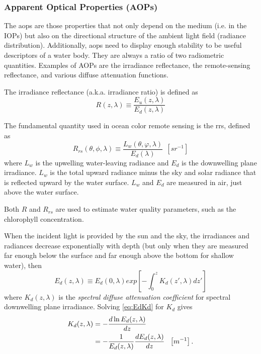 \subsubsection*{Apparent Optical Properties (AOPs)}
The \gls{aops} are those properties that not only depend on the medium (i.e. in the IOPs) but also on the directional structure of the ambient light field (radiance distribution). Additionally, \gls{aops} need to display enough stability to be useful descriptors of a water body. They are always a ratio of two radiometric quantities. Examples of AOPs are the irradiance reflectance, the remote-sensing reflectance, and various diffuse attenuation functions.

The irradiance reflectance (a.k.a. irradiance ratio) is defined as
\begin{equation}
  R(z,\lambda)\equiv \frac{E_u(z,\lambda)}{E_d(z,\lambda)}
\end{equation}

The fundamental quantity used in ocean color remote sensing is the \acrfull{rrs}, defined as
\begin{equation}
  R_{rs}(\theta,\phi,\lambda)\equiv \frac{L_w(\theta,\varphi,\lambda)}{E_d(\lambda)}~~\left[sr^{-1} \right]
\end{equation}
where $L_w$ is the upwelling water-leaving radiance and $E_d$ is the downwelling plane irradiance. $L_w$ is the total upward radiance minus the sky and solar radiance that is reflected upward by the water surface. $L_w$ and $E_d$ are measured in air, just above the water surface.

Both $R$ and $R_{rs}$ are used to estimate water quality parameters, such as the chlorophyll concentration.

When the incident light is provided by the sun and the sky, the irradiances and radiances decrease exponentially with depth (but only when they are measured far enough below the surface and far enough above the bottom for shallow water), then
\begin{equation}\label{eq:EdKd}
  E_d(z,\lambda)\equiv E_d(0,\lambda) exp\left[-\int_0^{z}K_d(z',\lambda)dz'\right]
\end{equation}
where $K_d(z,\lambda)$ is the {\it spectral diffuse attenuation coefficient} for spectral downwelling plane irradiance. Solving \autoref{eq:EdKd} for $K_d$ gives
\begin{align}
  K_d(z,\lambda)  &=- \frac{d\ln E_d(z,\lambda)}{dz} \notag \\
          &=-\frac{1}{E_d(z,\lambda)}\frac{dE_d(z,\lambda)}{dz} ~~\left[m^{-1} \right].
\end{align}

